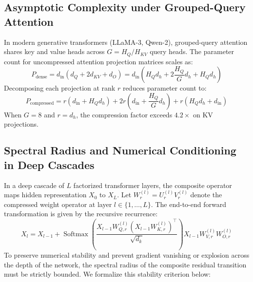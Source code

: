 \subsection*{Asymptotic Complexity under Grouped-Query Attention}
In modern generative transformers (LLaMA-3, Qwen-2), grouped-query attention shares key and value heads across $G = H_Q / H_{KV}$ query heads. The parameter count for uncompressed attention projection matrices scales as:
\[
P_{\text{dense}} = d_{\text{in}} \left( d_Q + 2 d_{KV} + d_O \right) = d_{\text{in}} \left( H_Q d_h + 2 \frac{H_Q}{G} d_h + H_Q d_h \right)
\]
Decomposing each projection at rank $r$ reduces parameter count to:
\[
P_{\text{compressed}} = r \left( d_{\text{in}} + H_Q d_h \right) + 2 r \left( d_{\text{in}} + \frac{H_Q}{G} d_h \right) + r \left( H_Q d_h + d_{\text{in}} \right)
\]
When $G = 8$ and $r = d_h$, the compression factor exceeds $4.2\times$ on KV projections.

\subsection*{Spectral Radius and Numerical Conditioning in Deep Cascades}
In a deep cascade of $L$ factorized transformer layers, the composite operator maps hidden representation $X_0$ to $X_L$. Let $W^{(l)}_r = U^{(l)}_r V^{(l)}_r$ denote the compressed weight operator at layer $l \in \{1, \dots, L\}$. The end-to-end forward transformation is given by the recursive recurrence:
\[
X_l = X_{l-1} + \operatorname{Softmax}\left( \frac{X_{l-1} W^{(l)}_{Q, r} (X_{l-1} W^{(l)}_{K, r})^\top}{\sqrt{d_k}} \right) X_{l-1} W^{(l)}_{V, r} W^{(l)}_{O, r}
\]
To preserve numerical stability and prevent gradient vanishing or explosion across the depth of the network, the spectral radius of the composite residual transition must be strictly bounded. We formalize this stability criterion below:


